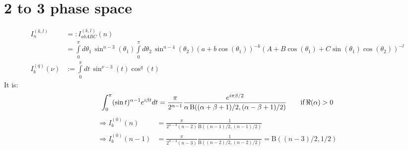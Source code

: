 \documentclass[
  english,		%
  a4paper,		%
  11pt,			%
  DIV=12,		%
  parskip=half  	%
]{scrartcl}
\begin{document}
\section{2 to 3 phase space}

\begin{align}
I_n^{(k,l)} &=: I_{abABC}^{(k,l)}(n)\\
 &= \int\limits_0^\pi\!d\theta_1\,\sin^{n-3}(\theta_1)\int\limits_0^\pi\!d\theta_2\,\sin^{n-4}(\theta_2)(a+b\cos(\theta_1))^{-k}(A+B\cos(\theta_1)+C\sin(\theta_1)\cos(\theta_2))^{-l}\\
I_{b}^{(q)}(\nu) &:= \int\limits_0^\pi\!dt\,\sin^{\nu-3}(t)\cos^{q}(t)
\end{align}
It is:
\begin{equation}
\int_{0}^{\pi}(\mathop{\sin\/}\nolimits t)^{\alpha-1}e^{i\beta t}dt=\frac{\pi}{2^{\alpha-1}} \frac{e^{i\pi \beta/2}}{\alpha\mathop{\mathrm{B}\/}\nolimits\!\left((\alpha+\beta+1)/2,(\alpha-\beta+1)/2\right)} \qquad\text{if}\,\Re(\alpha) > 0
\end{equation}
\begin{align}
\Rightarrow I_{b}^{(0)}(n) &= \frac{\pi}{2^{n-3}(n-2)}\frac 1 {\mathrm{B}((n-1)/2,(n-1)/2)}\\
\Rightarrow I_{b}^{(0)}(n-1) &= \frac{\pi}{2^{n-4}(n-3)}\frac 1 {\mathrm{B}((n-2)/2,(n-2)/2)}=\mathrm{B}((n-3)/2,1/2)
\end{align}
\end{document}
